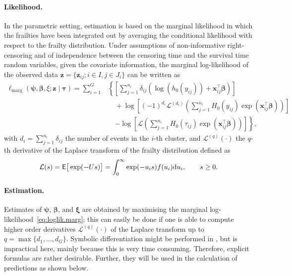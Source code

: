 \paragraph{Likelihood.}
In the parametric setting, estimation is based on the marginal likelihood 
  in which the frailties have been integrated out by averaging the conditional likelihood 
  with respect to the frailty distribution. 
Under assumptions 
  of non-informative right-censoring and of 
  independence between the censoring time and the survival time random variables,
  given the covariate information,
  the marginal log-likelihood of the observed data $\bm z = \{ \bm z_{ij} ; i\in I, j \in J_i \}$ 
  can be written as 
    \citep{vandenBergDrepper12}
\begin{align}
  \ell_{\mathrm{marg}}(\bm\psi, \bm\beta, \xi; \bm z \mid \bm \tau) = 
    \sum_{i=1}^G &\left\{
      \left[ \sum_{j=1}^{n_i}
        \delta_{ij} \left( \log(h_0(y_{ij})) + \bm x_{ij}^\top\bm\beta \right)
      \right]\right.
      \nonumber \\  
      &\quad + \log \left[ (-1)^{d_i} \mathcal L^{(d_i)} \left(
        \sum_{j=1}^{n_i} H_0(y_{ij}) \exp(\bm x_{ij}^\top\bm\beta)
      \right) \right]
      \nonumber \\  
      &\quad \left.-\log \left[ \mathcal L\left(
        \sum_{j=1}^{n_i} H_0(\tau_{ij}) \exp(\bm x_{ij}^\top\bm\beta)
      \right) \right]
    \right\},
  \label{eq:loglik.marg}
\end{align}
  with $d_i = \sum_{j=1}^{n_i} \delta_{ij}$ the number of events in the $i$-th cluster, and
  $\mathcal L^{(q)}(\cdot)$ the $q$-th derivative of the Laplace transform of the frailty distribution
    defined as
  \[
    \mathcal{L} ( s ) = \mathsf{E}\big[ \exp(-Us) \big] =
      \int_{0}^{\infty} \exp ( - u_{i} s ) f ( u_{i} ) \mathrm{d}u_{i}, \qquad s \geq 0.
  \]

\paragraph{Estimation.}
Estimates of $\bm{\psi}$, $\bm{\beta}$, and $\bm{\xi}$ are obtained by maximising
  the marginal log-likelihood~\ref{eq:loglik.marg};
this can easily be done if one is able to compute higher order derivatives 
  $\mathcal{L}^{( q )} ( \cdot )$ of the Laplace transform up to $q = \max \{ d_{1}, \ldots, d_{G} \}$.
Symbolic differentiation might be performed in ,
  but is impractical here, mainly because this is very time consuming.
Therefore, explicit formulas are rather desirable.
Further, they will be used in the calculation of predictions as shown below.
 
